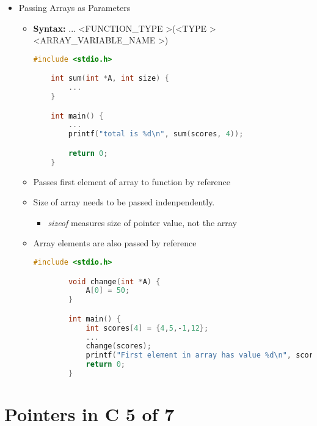 \documentclass[12pt]{article}
\begin{document}
\begin{itemize}
    \item Passing Arrays as Parameters
    \begin{itemize}
        \item \textbf{Syntax:} ... \textless FUNCTION\_TYPE \textgreater(\textless TYPE \textgreater *\textless ARRAY\_VARIABLE\_NAME \textgreater)

    \begin{lstlisting}[language=c]
    #include <stdio.h>

    int sum(int *A, int size) {
        ...
    }

    int main() {
        ...
        printf("total is %d\n", sum(scores, 4));

        return 0;
    }
    \end{lstlisting}
        \item Passes first element of array to function by reference
        \item Size of array needs to be passed indenpendently.
        \begin{itemize}
            \item \textit{sizeof} measures size of pointer value, not the array
        \end{itemize}
        \item Array elements are also passed by reference

        \begin{lstlisting}[language=c]
        #include <stdio.h>

        void change(int *A) {
            A[0] = 50;
        }

        int main() {
            int scores[4] = {4,5,-1,12};
            ...
            change(scores);
            printf("First element in array has value %d\n", scores[0]); // <- returns 50, instead of 4
            return 0;
        }
        \end{lstlisting}
    \end{itemize}
\end{itemize}

\bigskip

\section*{Pointers in C 5 of 7}

\bigskip
\end{document}
